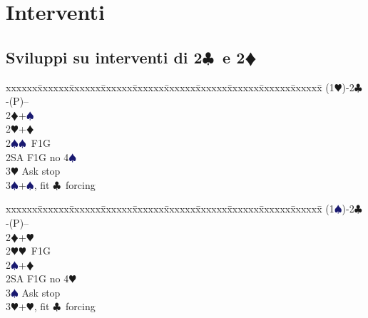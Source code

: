 \documentclass[a4paper,italian]{article}
\newcommand{\BC}{\textcolor{OliveGreen}{$\clubsuit$}}
\newcommand{\BD}{\textcolor{RedOrange}{$\vardiamondsuit$}}
\newcommand{\BH}{\textcolor{Red2}{$\varheartsuit${}}}
\newcommand{\BS}{\textcolor{MidnightBlue}{$\spadesuit${}}}
\newcommand{\pdfc}{\texorpdfstring{\BC{}}{C}}
\newcommand{\pdfd}{\texorpdfstring{\BD{}}{D}}
\newenvironment{bidtable}
{\begin{tabbing}

    xxxxxx\=xxxxxx\=xxxxxx\=xxxxxx\=xxxxxx\=xxxxxx\=xxxxxx\=xxxxxx\=xxxxxx\=xxxxxx\=\kill}
{\end{tabbing} }%
\begin{document}
                                    \section{Interventi}
                                    \begin{multicols}{2}
                                        \subsection{Sviluppi su interventi di 2\pdfc\ e 2\pdfd}
                                        \begin{bidtable}
                                            (1\BH)-2\BC-(P)--\\
                                            2\BD {}+\BS\\
                                            2\BH {}+\BD \\
                                            2\BS {}\BS\ F1G\\
                                            2SA \> F1G no 4\BS\\
                                            3\BH \> Ask stop\\
                                            3\BS {}+\BS, fit \BC\ forcing
                                        \end{bidtable}
                                        \begin{bidtable}
                                            (1\BS)-2\BC-(P)--\\
                                            2\BD {}+\BH\\
                                            2\BH {}\BH\ F1G\\
                                            2\BS {}+\BD \\
                                            2SA \> F1G no 4\BH\\
                                            3\BS \> Ask stop\\
                                            3\BH {}+\BH, fit \BC\ forcing
                                        \end{bidtable}


\end{multicols}
\end{document}
